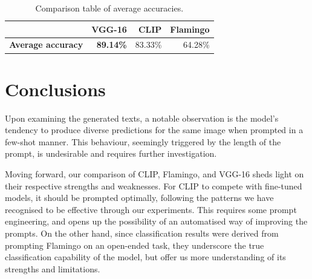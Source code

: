 \begin{table}[h]
    \centering
    \begin{tabularx}{\textwidth}{|l|r|r|r|}
        \hline
        & \textbf{VGG-16} & \textbf{CLIP} & \textbf{Flamingo} \\
        \hline
        \textbf{Average accuracy} & \bf 89.14\% & 83.33\% & 64.28\% \\
        \hline
    \end{tabularx}
    \caption{Comparison table of average accuracies.}
    \label{tab:comparison}
\end{table}

\section{Conclusions}

Upon examining the generated texts, a notable observation is the model's tendency to produce diverse predictions for the same image when prompted in a few-shot manner. This behaviour, seemingly triggered by the length of the prompt, is undesirable and requires further investigation.

Moving forward, our comparison of CLIP, Flamingo, and VGG-16 sheds light on their respective strengths and weaknesses. For CLIP to compete with fine-tuned models, it should be prompted optimally, following the patterns we have recognised to be effective through our experiments. This requires some prompt engineering, and opens up the possibility of an automatised way of improving the prompts. On the other hand, since classification results were derived from prompting Flamingo on an open-ended task, they underscore the true classification capability of the model, but offer us more understanding of its strengths and limitations.